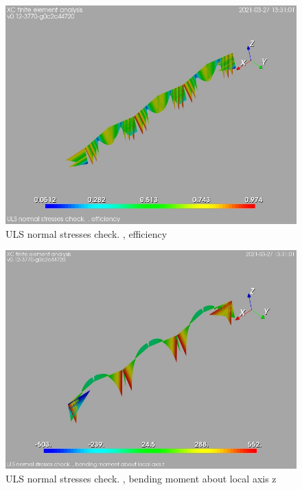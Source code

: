\begin{figure}
\begin{center}
\includegraphics[width=\linewidth]{calc_results/sole_zeinali/text/graphics/normStrsULS/allMemberSetCF}
\caption{ULS normal stresses check. , efficiency}
\end{center}
\end{figure}
\begin{figure}
\begin{center}
\includegraphics[width=\linewidth]{calc_results/sole_zeinali/text/graphics/normStrsULS/allMemberSetMz}
\caption{ULS normal stresses check. , bending moment about local axis z}
\end{center}
\end{figure}
